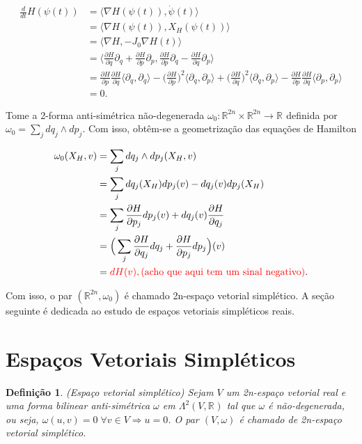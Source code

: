 \documentclass[12pt]{book}
\newtheorem{definicao}[teorema]{Definição}
\newcommand{\bigparenteses}[1]{\Big( #1 \Big) }
\newcommand{\campohamiltoniano}[1]{X_{H}(#1)}
\newcommand{\campohamiltonianoabrev}{X_{H}}
\newcommand{\derivada}[2]{\frac{d #1}{d #2}}
\newcommand{\derivadaparcial}[2]{\frac{\partial #1}{\partial #2}}
\newcommand{\derivadaparcialabrev}[1]{\partial_{#1}}
\newcommand{\estruturacomplexa}{J_{0}}
\newcommand{\formaSimpleticaabrev}{\omega_{0}}
\newcommand{\formaSimpleticaPadrao}[2]{\omega_{0}(#1, #2)}
\newcommand{\produtointerno}[2]{\langle #1, #2 \rangle}
\newcommand{\real}[1]{\mathbb{R}^{#1}}
\newcommand{\reta}{\real{}}
\newcommand{\alerta}[1]{{\color{red}#1}}
\begin{document}
	$$
	\begin{aligned}
	\derivada{}{t}H(\psi(t)) 
	&= \produtointerno{\nabla H(\psi(t))}{\dot{\psi}(t)} 
	\\
	&= \produtointerno{\nabla H(\psi(t))}{\campohamiltoniano{\psi(t)}} 
	\\
	&= 
	\produtointerno{\nabla H}{-\estruturacomplexa \nabla H(t)} 
	\\
	&=\produtointerno{\derivadaparcial{H}{q}\derivadaparcialabrev{q} + \derivadaparcial{H}{p}\derivadaparcialabrev{p}
	}{\derivadaparcial{H}{p}\derivadaparcialabrev{q} - \derivadaparcial{H}{q}\derivadaparcialabrev{p}}
	\\
	&=\derivadaparcial{H}{p}\derivadaparcial{H}{q}\produtointerno{\derivadaparcialabrev{q}}{\derivadaparcialabrev{q}}-\bigparenteses{\derivadaparcial{H}{p}}^{2}\produtointerno{\derivadaparcialabrev{q}
	}{\derivadaparcialabrev{p}}	
	+\bigparenteses{\derivadaparcial{H}{q}}^{2}\produtointerno{\derivadaparcialabrev{q}}{\derivadaparcialabrev{p}}
	-\derivadaparcial{H}{p}\derivadaparcial{H}{q}\produtointerno{\derivadaparcialabrev{p}}{\derivadaparcialabrev{p}}
	\\
	&=0.
	\end{aligned}
	$$
	
	Tome a 2-forma anti-simétrica não-degenerada $\formaSimpleticaabrev :\real{2n}\times \real{2n} \to \reta$ definida por $\formaSimpleticaabrev = \sum_{j}  dq_{j}\wedge dp_{j}$. Com isso, obtêm-se a geometrização das equações de Hamilton
	
	$$
	\begin{aligned}
	\formaSimpleticaPadrao{\campohamiltonianoabrev}{v} 
	&= \sum_{j}  dq_{j}\wedge dp_{j}(\campohamiltonianoabrev, v) 
	\\
	&= \sum_{j}  dq_{j}(\campohamiltonianoabrev)dp_{j}(v) - dq_{j}(v)dp_{j}(\campohamiltonianoabrev)
	\\
	&= \sum_{j} \derivadaparcial{H}{p_{j}}dp_{j}(v) + dq_{j}(v)\derivadaparcial{H}{q_{j}}
	\\
	&= \Big(\sum_{j} \derivadaparcial{H}{q_{j}}dq_{j} +\derivadaparcial{H}{p_{j}}dp_{j} \Big)(v)
	\\
	&= \alerta{dH(v), \text{(acho que aqui tem um sinal negativo)}}.
	\end{aligned}
	$$
	
	Com isso, o par $(\real{2n}, \formaSimpleticaabrev)$ é chamado 2n-espaço vetorial simplético. A seção seguinte é dedicada ao estudo de espaços vetoriais simpléticos reais.
	
	\section{Espaços Vetoriais Simpléticos}\label{secao_espacos_vetoriais_simpleticos}
	\begin{definicao}
		(Espaço vetorial simplético) Sejam $V$ um 2n-espaço vetorial real e uma forma bilinear anti-simétrica $\omega$ em $\Lambda^{2}(V, \real{})$ tal que $\omega$ é não-degenerada, ou seja, $\omega(u,v) = 0 \; \forall v \in V \Rightarrow u=0$. O par $(V, \omega)$ é chamado de 2n-espaço vetorial simplético.
	\end{definicao}
	
\end{document}
